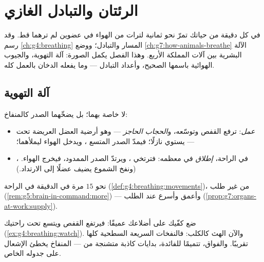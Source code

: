 \chapter{الرئتان والتبادل الغازي}\label{ch:g7:lungs-and-gas-exchange}

في كل دقيقة من حياتك تمرّ نحو ثمانية لترات من الهواء في عضوين لم
ترهما قط. وقد رسم \cref{ch:g4:breathing} المسار والتبادل؛ ووضع
\cref{ch:g7:how-animals-breathe} الآلة البشرية بين آلات المملكة
الأربع. وهذا الفصل يكمل الصورة: آلة التهوية، والجيوب الهوائية
باسمها الصحيح، وأعداد التبادل --- وما يفعله الدخان بالعمل كله.

\section{آلة التهوية}

\begin{proposition}\label{prop:g7:lungs-and-gas-exchange:ventilation}
لا   خاصة بهما؛ بل يضخّهما الصدر كالمنفاخ:
\begin{itemize}
  \item {} \emph{عمل}:   ترفع القفص وتوسّعه،
        و\emph{الحجاب الحاجز} --- وهو أرضية
        العضل العريضة تحت  --- يستوي نازلًا؛ فيمدّ الصدر
        المتسع ، ويدخل الهواء ليملأهما؛
  \item {}، في الراحة، \emph{إطلاق} في معظمه: فترتخي
        ، ويرتدّ الصدر الممدود، فيخرج الهواء. (ونفخ
        الشموع يضيف عضلًا إلى الارتداد.)
\end{itemize}
نحو $15$ مرة في الدقيقة في الراحة
(\cref{def:g4:breathing:movements})، من غير طلب
(\cref{rem:g5:brain-in-command:more}) --- وأعمق وأسرع عند الطلب
(\cref{prop:g7:organs-at-work:supply}).
\end{proposition}
\admitted

\begin{example}\label{ex:g7:lungs-and-gas-exchange:feel}
ضع كفّيك على أضلاعك  عميقًا: فيرتفع القفص ويتسع تحت راحتيك
(\cref{ex:g4:breathing:watch}). والآن الهث كالكلب: فالنفخات
السريعة السطحية كلها  تقريبًا. والفواق، تتميمًا للفائدة،
بدايات كاذبة متشنجة من  --- المنفاخ يخطئ الإشعال على
جدوله الخاص.
\end{example}

